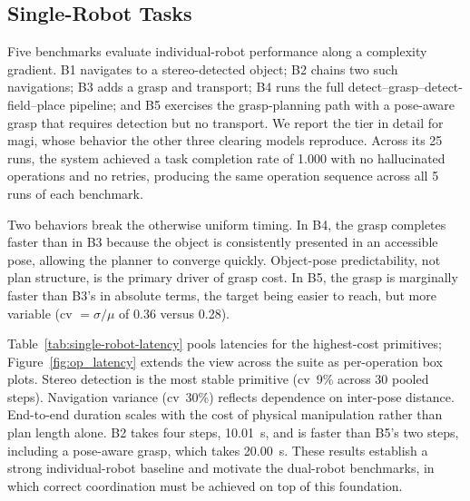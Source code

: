 \subsection{Single-Robot Tasks}
Five benchmarks evaluate individual-robot performance along a complexity gradient. B1 navigates to a stereo-detected object; B2 chains two such navigations; B3 adds a grasp and transport; B4 runs the full detect–grasp–detect-field–place pipeline; and B5 exercises the grasp-planning path with a pose-aware grasp that requires detection but no transport. We report the tier in detail for \gls{magi}, whose behavior the other three clearing models reproduce. Across its 25 runs, the system achieved a task completion rate of 1.000 with no hallucinated operations and no retries, producing the same operation sequence across all 5 runs of each benchmark.

Two behaviors break the otherwise uniform timing. In B4, the grasp completes faster than in B3 because the object is consistently presented in an accessible pose, allowing the planner to converge quickly. Object-pose predictability, not plan structure, is the primary driver of grasp cost. In B5, the grasp is marginally faster than B3’s in absolute terms, the target being easier to reach, but more variable (\gls{cv} $=\sigma/\mu$ of 0.36 versus 0.28).

Table~\ref{tab:single-robot-latency} pools latencies for the highest-cost primitives; Figure~\ref{fig:op_latency} extends the view across the suite as per-operation box plots. Stereo detection is the most stable primitive (\gls{cv}~9\% across 30 pooled steps). Navigation variance (\gls{cv}~30\%) reflects dependence on inter-pose distance. End-to-end duration scales with the cost of physical manipulation rather than plan length alone. B2 takes four steps, 10.01~s, and is faster than B5’s two steps, including a pose-aware grasp, which takes 20.00~s. These results establish a strong individual-robot baseline and motivate the dual-robot benchmarks, in which correct coordination must be achieved on top of this foundation.

